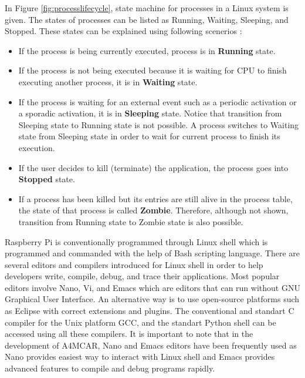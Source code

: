 In Figure \ref{fig:processlifecycle}, state machine for processes in a Linux system is given. The states of processes can be listed as Running, Waiting, Sleeping, and Stopped. These states can be explained using following scenerios \cite{linuxkernelbook}:
\begin{itemize}
	\item If the process is being currently executed, process is in \textbf{Running} state.
	\item If the process is not being executed because it is waiting for CPU to finish executing another process, it is in \textbf{Waiting} state.
	\item If the process is waiting for an external event such as a periodic activation or a sporadic activation, it is in \textbf{Sleeping} state. Notice that transition from Sleeping state to Running state is not possible. A process switches to Waiting state from Sleeping state in order to wait for current process to finish its execution.
	\item If the user decides to kill (terminate) the application, the process goes into \textbf{Stopped} state.
	\item If a process has been killed but its entries are still alive in the process table, the state of that process is called \textbf{Zombie}. Therefore, although not shown, transition from Running state to Zombie state is also possible.
\end{itemize}

Raspberry Pi is conventionally programmed through Linux shell which is programmed and commanded with the help of Bash scripting language. There are several editors and compilers introduced for Linux shell in order to help developers write, compile, debug, and trace their applications. Most popular editors involve Nano, Vi, and Emacs which are editors that can run without GNU Graphical User Interface. An alternative way is to use open-source platforms such as Eclipse with correct extensions and plugins. The conventional and standart C compiler for the Unix platform GCC, and the standart Python shell can be accessed using all these compilers. It is important to note that in the development of A4MCAR, Nano and Emacs editors have been frequently used as Nano provides easiest way to interact with Linux shell and Emacs provides advanced features to compile and debug programs rapidly.

